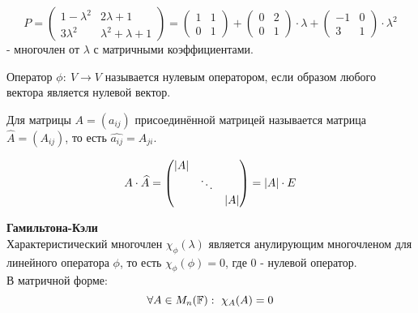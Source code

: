     \begin{example1}
        $$P = \begin{pmatrix}
        1-\lambda^2 & 2\lambda+1 \\
        3\lambda^2 & \lambda^2+\lambda+1
        \end{pmatrix} = \begin{pmatrix}
        1 & 1\\
        0 & 1
        \end{pmatrix}+\begin{pmatrix}
        0 & 2\\
        0 & 1
        \end{pmatrix}\cdot \lambda+\begin{pmatrix}
        -1 & 0\\
        3 & 1
        \end{pmatrix}\cdot \lambda^2$$
    - многочлен от $\lambda$ с матричными коэффициентами.
    \end{example1}
    \begin{definition}
        Оператор $\phi: \ V \to V$ называется нулевым оператором, если образом любого вектора является нулевой вектор.
    \end{definition}
    \begin{definition}
        Для матрицы $A = (a_{ij})$ присоединённой матрицей называется матрица $\widehat{A} = (A_{ij})$, то есть $\widehat{a_{ij}} = A_{ji}$.
    \end{definition}
    \begin{properties1}
        $$A\cdot\widehat{A} = \begin{pmatrix}
        |A|\\
        \null & \ddots\\
        \null & \null & |A|
        \end{pmatrix} = |A|\cdot E$$
    \end{properties1}
    \begin{theorem} \textbf{Гамильтона-Кэли} \\
        Характеристический многочлен $\chi_{\phi}(\lambda)$ является анулирующим многочленом для линейного оператора $\phi$, то есть $\chi_{\phi}(\phi) = 0$, где 0 - нулевой оператор.\\
        В матричной форме:
        $$\forall A\in M_n(\F): \ \chi_{A}(A) = 0$$
    \end{theorem}
